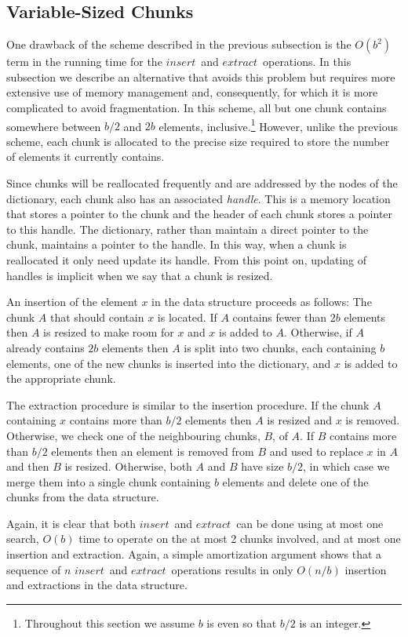 \documentclass{DIKU-article}
\newcommand{\Insert}{\mbox{$\mathit{insert}$}}
\newcommand{\Extract}{\mbox{$\mathit{extract}$}}
\begin{document}
\subsection{Variable-Sized Chunks}

One drawback of the scheme described in the previous subsection is the
$O(b^2)$ term in the running time for the \Insert\ and \Extract\
operations.  In this subsection we describe an alternative that avoids
this problem but requires more extensive use of memory management and,
consequently, for which it is more complicated to avoid fragmentation.
In this scheme, all but one chunk contains somewhere between $b/2$ and
$2b$ elements, inclusive.\footnote{Throughout this section we assume
$b$ is even so that $b/2$ is an integer.}  However, unlike the
previous scheme, each chunk is allocated to the precise size required
to store the number of elements it currently contains.

Since chunks will be reallocated frequently and are addressed by the
nodes of the dictionary, each chunk also has an associated
\emph{handle}.  This is a memory location that stores a pointer to the
chunk and the header of each chunk stores a pointer to this handle.
The dictionary, rather than maintain a direct pointer to the chunk,
maintains a pointer to the handle.  In this way, when a chunk is
reallocated it only need update its handle.  From this point on,
updating of handles is implicit when we say that a chunk is resized.

An insertion of the element $x$ in the data structure proceeds as
follows: The chunk $A$ that should contain $x$ is located.  If $A$
contains fewer than $2b$ elements then $A$ is resized to make room for
$x$ and $x$ is added to $A$.  Otherwise, if $A$ already contains $2b$
elements then $A$ is split into two chunks, each containing $b$
elements, one of the new chunks is inserted into the dictionary, and
$x$ is added to the appropriate chunk.

The extraction procedure is similar to the insertion procedure.  If
the chunk $A$ containing $x$ contains more than $b/2$ elements then
$A$ is resized and $x$ is removed.  Otherwise, we check one of the
neighbouring chunks, $B$, of $A$. If $B$ contains more than $b/2$
elements then an element is removed from $B$ and used to replace $x$
in $A$ and then $B$ is resized. Otherwise, both $A$ and $B$ have size
$b/2$, in which case we merge them into a single chunk containing $b$
elements and delete one of the chunks from the data structure.

Again, it is clear that both \Insert\ and \Extract\ can be done using
at most one search, $O(b)$ time to operate on the at most 2 chunks
involved, and at most one insertion and extraction.  Again, a simple
amortization argument shows that a sequence of $n$ \Insert\ and
\Extract\ operations results in only $O(n/b)$ insertion and
extractions in the data structure.
\end{document}
